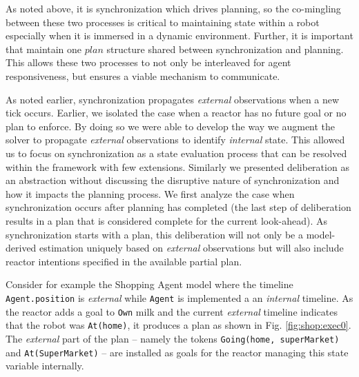 As noted above, it is synchronization which drives planning, so the
co-mingling between these two processes is critical to maintaining
state within a robot especially when it is immersed in a dynamic
environment. Further, it is important that \rx maintain
one $plan$ structure shared between synchronization and planning. This
allows these two processes to not only be interleaved for agent
responsiveness, but ensures a viable mechanism to communicate.


As noted earlier, synchronization propagates {\em
  external} observations when a new tick occurs. Earlier, we isolated
the case when a reactor has no future goal or no plan to enforce. By
doing so we were able to develop the way we augment the \eu solver to
propagate {\em external} observations to identify {\em
  internal} state. This allowed us to focus on synchronization as a
state evaluation process that can be resolved within the \eu framework
with few extensions. Similarly we presented deliberation as an
abstraction without discussing the disruptive nature of
synchronization and how it impacts the planning process. We first
analyze the case when synchronization occurs after planning has
completed (\ie the last step of deliberation results in a plan that is
considered complete for the current look-ahead). As synchronization
starts with a plan, this deliberation will not only be a model-derived
estimation uniquely based on {\em external} observations but will also
include reactor intentions specified in the available partial plan.

Consider for example the Shopping Agent model where the timeline 
\texttt{Agent.position} is {\em external} while \texttt{Agent} is
implemented a an {\em internal} timeline. As the reactor adds a goal to
\texttt{Own} milk and the current {\em external} timeline indicates
that the robot was \texttt{At(home)}, it produces a plan as shown in
Fig. \ref{fig:shop:exec0}. The {\em external} part of the plan --
namely the tokens \texttt{Going(home, superMarket)} and
\texttt{At(SuperMarket)} -- are installed as goals for the reactor
managing this state variable internally.

